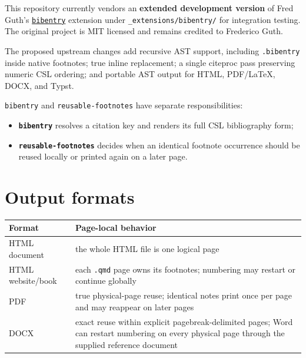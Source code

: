 \documentclass[
  letterpaper,
  DIV=11,
  numbers=noendperiod]{scrartcl}
\providecommand{\tightlist}{%
  \setlength{\itemsep}{0pt}\setlength{\parskip}{0pt}}
\begin{document}
This repository currently vendors an \textbf{extended development
version} of Fred Guth's
\href{https://github.com/fredguth/bibentry}{\texttt{bibentry}} extension
under \texttt{\_extensions/bibentry/} for integration testing. The
original project is MIT licensed and remains credited to Frederico Guth.

The proposed upstream changes add recursive AST support, including
\texttt{.bibentry} inside native footnotes; true inline replacement; a
single citeproc pass preserving numeric CSL ordering; and portable AST
output for HTML, PDF/LaTeX, DOCX, and Typst.

\texttt{bibentry} and \texttt{reusable-footnotes} have separate
responsibilities:

\begin{itemize}
\tightlist
\item
  \textbf{\texttt{bibentry}} resolves a citation key and renders its
  full CSL bibliography form;
\item
  \textbf{\texttt{reusable-footnotes}} decides when an identical
  footnote occurrence should be reused locally or printed again on a
  later page.
\end{itemize}

\section{Output formats}\label{output-formats}

\begin{longtable}[]{@{}
  >{\raggedright\arraybackslash}p{}
  >{\raggedright\arraybackslash}p{}@{}}
\toprule\noalign{}
\begin{minipage}[b]{\linewidth}\raggedright
Format
\end{minipage} & \begin{minipage}[b]{\linewidth}\raggedright
Page-local behavior
\end{minipage} \\
\midrule\noalign{}
\endhead
\bottomrule\noalign{}
\endlastfoot
HTML document & the whole HTML file is one logical page \\
HTML website/book & each \texttt{.qmd} page owns its footnotes;
numbering may restart or continue globally \\
PDF & true physical-page reuse; identical notes print once per page and
may reappear on later pages \\
DOCX & exact reuse within explicit pagebreak-delimited pages; Word can
restart numbering on every physical page through the supplied reference
document \\
\end{longtable}
\end{document}
